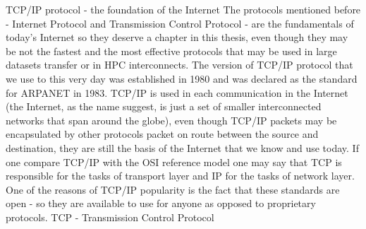 \documentclass[magisterska,en]{pracamgr}
\begin{document}
TCP/IP protocol - the foundation of the Internet
The protocols mentioned before - Internet Protocol and Transmission Control Protocol - are the fundamentals of today's Internet so they deserve a chapter in this thesis, even though they may be not the fastest and the most effective protocols that may be used in large datasets transfer or in HPC interconnects. The version of TCP/IP protocol that we use to this very day was established in 1980 and was declared as the standard for ARPANET in 1983.\cite{an_early_history_of_the_internet} TCP/IP is used in each communication in the Internet (the Internet, as the name suggest, is just a set of smaller interconnected networks that span around the globe), even though TCP/IP packets may be encapsulated by other protocols packet on route between the source and destination, they are still the basis of the Internet that we know and use today. If one compare TCP/IP with the OSI reference model one may say that TCP is responsible for the tasks of transport layer and IP for the tasks of network layer. One of the reasons of TCP/IP popularity is the fact that these standards are open - so they are available to use for anyone as opposed to proprietary protocols.
TCP - Transmission Control Protocol
\end{document}
